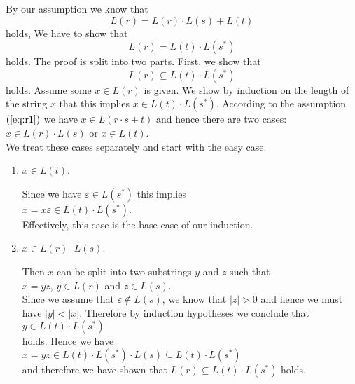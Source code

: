 \proofEng
By our assumption we know that 
\begin{equation}
  \label{eq:r1}
  L(r) = L(r) \cdot L(s) + L(t)  
\end{equation}
holds,  We have to show that 
\begin{equation}
  \label{eq:r2}
  L(r) = L(t) \cdot L(s^*)  
\end{equation}
holds.  The proof is  split into two parts.  First, we show that
\begin{equation}
  \label{eq:r3}
  L(r) \subseteq L(t) \cdot L(s^*)  
\end{equation}
holds.  Assume some $x \in L(r)$ is given.  We show by induction on the length of the string $x$
that this implies $x \in L(t) \cdot L(s^*)$.   According to the assumption  $(\ref{eq:r1})$ we have
$x \in L(r \cdot s + t)$ and hence there are two cases:
\\[0.2cm]
\hspace*{1.3cm}
$x \in L(r) \cdot L(s)$ \quad or \quad $x \in L(t)$.
\\[0.2cm]
We treat these cases separately and start with the easy case.
\begin{enumerate}
\item $x \in L(t)$.

      Since we have  $\varepsilon \in L(s^*)$ this implies
      \\[0.2cm]
      \hspace*{1.3cm}
      $x = x\varepsilon \in L(t) \cdot L(s^*)$.
      \\[0.2cm]
      Effectively, this case is the base case of our induction.
\item $x \in L(r) \cdot L(s)$.

      Then  $x$ can be split into two substrings $y$ and $z$ such that
      \\[0.2cm]
      \hspace*{1.3cm}
      $x = yz$, \quad $y \in L(r)$ \quad and \quad  $z \in L(s)$.
      \\[0.2cm]
      Since we assume that $\varepsilon \not\in L(s)$, we know that  $|z|>0$ and hence we must have
      $|y| < |x|$.  Therefore by induction hypotheses we conclude that
      \\[0.2cm]
      \hspace*{1.3cm}
      $y \in L(t) \cdot L(s^*)$
      \\[0.2cm]
      holds.  Hence we have
      \\[0.2cm]
      \hspace*{1.3cm}
      $x = yz \in L(t) \cdot L(s^*) \cdot L(s) \subseteq L(t) \cdot L(s^*)$
      \\[0.2cm]
      and therefore we have shown that $L(r) \subseteq L(t) \cdot L(s^*)$ holds.
\end{enumerate}
